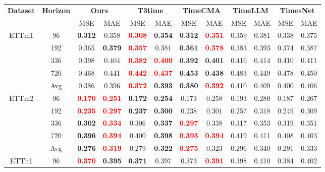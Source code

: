 \begin{table}[!htbp]
\begin{tabular}{c|c|cc|cc|cc|cc|cc}
\toprule
\multirow{2}{*}{\textbf{Dataset}} & \multirow{2}{*}{\textbf{Horizon}} &
\multicolumn{2}{c|}{\textbf{Ours}} &
\multicolumn{2}{c|}{\textbf{T3time}} &
\multicolumn{2}{c|}{\textbf{TimeCMA}} &
\multicolumn{2}{c|}{\textbf{TimeLLM}} &
\multicolumn{2}{c}{\textbf{TimesNet}} \\
& & MSE & MAE & MSE & MAE & MSE & MAE & MSE & MAE & MSE & MAE \\
\midrule
\multirow{5}{*}{ETTm1}
& 96 & \textbf{0.312} & 0.358 & \textbf{\textcolor{red}{0.308}} & \textbf{0.354} & \textbf{0.312} & \textbf{\textcolor{red}{0.351}} & 0.359 & 0.381 & 0.338 & 0.375 \\
& 192 & 0.365 & \textbf{0.379} & \textbf{\textcolor{red}{0.357}} & 0.381 & \textbf{0.361} & \textbf{\textcolor{red}{0.378}} & 0.383 & 0.393 & 0.374 & 0.387 \\
& 336 & 0.398 & 0.404 & \textbf{\textcolor{red}{0.382}} & \textbf{\textcolor{red}{0.400}} & \textbf{0.392} & \textbf{0.401} & 0.416 & 0.414 & 0.410 & 0.411 \\
& 720 & 0.468 & 0.441 & \textbf{\textcolor{red}{0.442}} & \textbf{\textcolor{red}{0.437}} & \textbf{0.453} & \textbf{0.438} & 0.483 & 0.449 & 0.478 & 0.450 \\
& Avg & 0.386 & 0.396 & \textbf{\textcolor{red}{0.372}} & \textbf{0.393} & \textbf{0.380} & \textbf{\textcolor{red}{0.392}} & 0.410 & 0.409 & 0.400 & 0.406 \\
\midrule
\multirow{5}{*}{ETTm2}
& 96 & \textbf{\textcolor{red}{0.170}} & \textbf{\textcolor{red}{0.251}} & \textbf{0.172} & \textbf{0.254} & 0.173 & 0.258 & 0.193 & 0.280 & 0.187 & 0.267 \\
& 192 & \textbf{\textcolor{red}{0.235}} & \textbf{\textcolor{red}{0.297}} & \textbf{0.237} & \textbf{0.300} & 0.238 & 0.301 & 0.257 & 0.318 & 0.249 & 0.309 \\
& 336 & \textbf{0.302} & \textbf{\textcolor{red}{0.334}} & 0.306 & \textbf{0.337} & \textbf{\textcolor{red}{0.297}} & 0.338 & 0.317 & 0.353 & 0.319 & 0.351 \\
& 720 & \textbf{0.396} & \textbf{\textcolor{red}{0.394}} & 0.400 & \textbf{0.398} & \textbf{\textcolor{red}{0.393}} & \textbf{\textcolor{red}{0.394}} & 0.419 & 0.411 & 0.408 & 0.403 \\
& Avg & \textbf{0.276} & \textbf{\textcolor{red}{0.319}} & 0.279 & \textbf{0.322} & \textbf{\textcolor{red}{0.275}} & 0.323 & 0.296 & 0.340 & 0.291 & 0.333 \\
\midrule
\multirow{5}{*}{ETTh1}
& 96 & \textbf{\textcolor{red}{0.370}} & \textbf{0.395} & \textbf{0.371} & 0.397 & 0.373 & \textbf{\textcolor{red}{0.391}} & 0.398 & 0.410 & 0.384 & 0.402 \\

\end{tabular}
\end{table}
